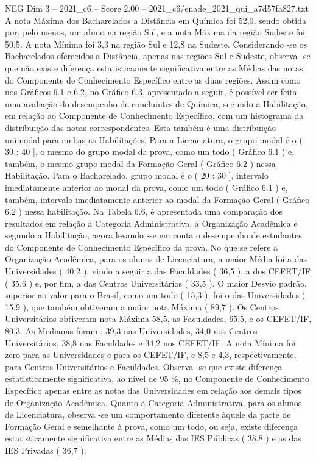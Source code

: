 \begin{textsample}{NEG Dim 3 – 2021\_c6 – Score 2.00 – 2021\_c6/enade\_2021\_qui\_a7d57fa827.txt}
A nota Máxima dos Bacharelados a Distância em Química foi 52,0, sendo obtida por, pelo menos, um aluno na região Sul, e a nota Máxima da região Sudeste foi 50,5.
A nota Mínima foi 3,3 na região Sul e 12,8 na Sudeste.
Considerando -se os Bacharelados oferecidos a Distância, apenas nas regiões Sul e Sudeste, observa -se que não existe diferença estatisticamente significativa entre as Médias das notas do Componente de Conhecimento Específico entre as duas regiões.
Assim como nos Gráficos 6.1 e 6.2, no Gráfico 6.3, apresentado a seguir, é possível ser feita uma avaliação do desempenho de concluintes de Química, segundo a Habilitação, em relação ao Componente de Conhecimento Específico, com um histograma da distribuição das notas correspondentes.
Esta também é uma distribuição unimodal para ambas as Habilitações.
Para a Licenciatura, o grupo modal é o ( 30 ; 40 ], o mesmo do grupo modal da prova, como um todo ( Gráfico 6.1 ) e, também, o mesmo grupo modal da Formação Geral ( Gráfico 6.2 ) nessa Habilitação.
Para o Bacharelado, grupo modal é o ( 20 ; 30 ], intervalo imediatamente anterior ao modal da prova, como um todo ( Gráfico 6.1 ) e, também, intervalo imediatamente anterior ao modal da Formação Geral ( Gráfico 6.2 ) nessa habilitação.
Na Tabela 6.6, é apresentada uma comparação dos resultados em relação a Categoria Administrativa, a Organização Acadêmica e segundo a Habilitação, agora levando -se em conta o desempenho de estudantes do Componente de Conhecimento Específico da prova.
No que se refere a Organização Acadêmica, para os alunos de Licenciatura, a maior Média foi a das Universidades ( 40,2 ), vindo a seguir a das Faculdades ( 36,5 ), a dos CEFET/IF ( 35,6 ) e, por fim, a das Centros Universitários ( 33,5 ).
O maior Desvio padrão, superior ao valor para o Brasil, como um todo ( 15,3 ), foi o das Universidades ( 15,9 ), que também obtiveram a maior nota Máxima ( 89,7 ).
Os Centros Universitários obtiveram nota Máxima 58,5, as Faculdades, 65,5, e os CEFET/IF, 80,3.
As Medianas foram : 39,3 nas Universidades, 34,0 nos Centros Universitários, 38,8 nas Faculdades e 34,2 nos CEFET/IF.
A nota Mínima foi zero para as Universidades e para os CEFET/IF, e 8,5 e 4,3, respectivamente, para Centros Universitários e Faculdades.
Observa -se que existe diferença estatisticamente significativa, ao nível de 95 \%, no Componente de Conhecimento Específico apenas entre as notas das Universidades em relação aos demais tipos de Organização Acadêmica.
Quanto a Categoria Administrativa, para os alunos de Licenciatura, observa -se um comportamento diferente àquele da parte de Formação Geral e semelhante à prova, como um todo, ou seja, existe diferença estatisticamente significativa entre as Médias das IES Públicas ( 38,8 ) e as das IES Privadas ( 36,7 ).

\end{textsample}

